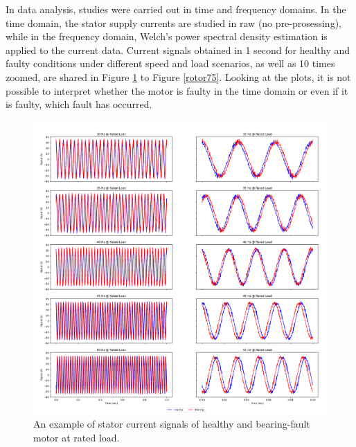 In data analysis, studies were carried out in time and frequency domains. In the time domain, the stator supply currents are studied in raw (no pre-prosessing), while in the frequency domain, Welch's power spectral density estimation is applied to the current data. Current signals obtained in 1 second for healthy and faulty conditions under different speed and load scenarios, as well as 10 times zoomed, are shared in Figure \ref{bearing100} to Figure \ref{rotor75}. Looking at the plots, it is not possible to interpret whether the motor is faulty in the time domain or even if it is faulty, which fault has occurred.
\pagebreak
\begin{figure}[p]
	\centering
	\includegraphics[width=0.75\paperwidth,keepaspectratio=true]{./fig/bearing_100.png}
	\caption{An example of stator current signals of healthy and bearing-fault motor at rated load.}	
	\label{bearing100}
\end{figure}
\pagebreak
